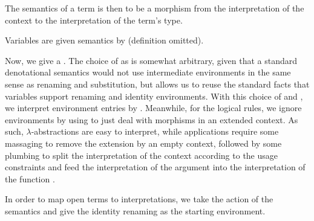 
The semantics of a term is then to be a morphism from the interpretation of the
context to the interpretation of the term's type.


Variables are given semantics by  (definition omitted).


Now, we give a .
The choice of \AgdaBound{$\V$} as
\AgdaRecord{\AgdaUnderscore{}$\sqni$\AgdaUnderscore{}} is somewhat arbitrary,
given that a standard denotational semantics would not use intermediate
environments in the same sense as renaming and substitution, but allows us to
reuse the standard facts that variables support renaming and identity
environments.
With this choice of \AgdaBound{$\V$} and \AgdaBound{$\C$}, we interpret
environment entries by .
Meanwhile, for the logical rules, we ignore environments by using
 to just deal with morphisms in an extended context.
As such, $\lambda$-abstractions are easy to interpret, while applications
require some massaging to remove the extension by an empty context, followed by
some plumbing to split the interpretation of the context according to the usage
constraints and feed the interpretation of the argument  into
the interpretation of the function .


In order to map open terms to interpretations, we take the action of the
semantics and give the identity renaming as the starting environment.


